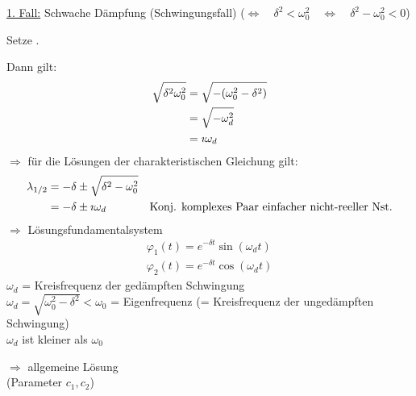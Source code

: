 \begin{enumerate}[A]
	\ul{1. Fall:} Schwache Dämpfung (Schwingungsfall)
	\quad($\Leftrightarrow\quad\delta^2<\omega_0^2\quad\Leftrightarrow\quad\delta^2-\omega_0^2<0$)
	
	Setze .
	
	Dann gilt:\\
	\begin{align*}
	\sqrt{\delta^2\omega_0^2}&=\sqrt{-(\omega_0^2-\delta^2)}\\
	&=\sqrt{-\omega_d^2}\\
	&=\imath\omega_d
	\end{align*}
	$\Rightarrow$ für die Lösungen der charakteristischen Gleichung gilt:
	\begin{align*}
	\lambda_{1/2}&=-\delta\pm\sqrt{\delta^2-\omega_0^2}\\
	&=-\delta\pm\imath\omega_d&\text{Konj. komplexes Paar einfacher nicht-reeller Nst.}
	\end{align*}
	$\Rightarrow$ Lösungsfundamentalsystem
	\begin{align*}
	\varphi_1(t)=e^{-\delta t}\sin(\omega_dt)\\
	\varphi_2(t)=e^{-\delta t}\cos(\omega_dt)
	\end{align*}
	$\omega_d$ = Kreisfrequenz der gedämpften Schwingung\\
	\hhspace{2cm}$\omega_d=\sqrt{\omega_0^2-\delta^2}<\omega_0$ = Eigenfrequenz (= Kreisfrequenz der ungedämpften Schwingung)\\
	$\omega_d$ ist kleiner als $\omega_0$
	
	$\Rightarrow$ allgemeine Lösung\\
	\hhspace{2cm}\qquad(Parameter $c_1,c_2$)
\end{enumerate}

\placeholder
